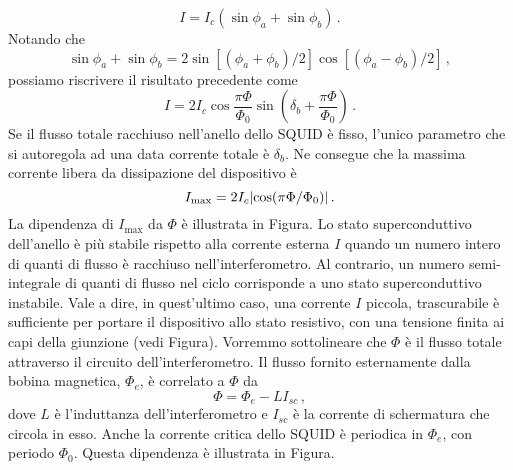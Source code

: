 \begin{equation*}
    I=I_c\left(\sin\phi_a + \sin\phi_b\right) \, .
\end{equation*}
Notando che
\begin{equation*}
    \sin\phi_a + \sin\phi_b = 2\sin[(\phi_a+\phi_b)/2]\cos[(\phi_a-\phi_b)/2] \, ,
\end{equation*}
possiamo riscrivere il risultato precedente come
\begin{equation*}
    I=2I_c \cos \frac{\pi\Phi}{\Phi_0}\sin\left(\delta_b + \frac{\pi\Phi}{\Phi_0}\right) \, .
\end{equation*}
Se il flusso totale racchiuso nell'anello dello SQUID è fisso, l'unico parametro che si autoregola ad una data corrente totale è $\delta_b$. Ne consegue che la massima corrente libera da dissipazione del dispositivo è
\begin{equation*}
    I_{\text{max}}=2I_c\abs{\cos(\pi\Phi/\Phi_0)} \, .
\end{equation*}
La dipendenza di $I_{\text{max}}$ da $\Phi$ è illustrata in Figura.
Lo stato superconduttivo dell'anello è più stabile rispetto alla corrente esterna $I$ quando un numero intero di quanti di flusso è racchiuso nell'interferometro. Al contrario, un numero semi-integrale di quanti di flusso nel ciclo corrisponde a uno stato superconduttivo instabile. Vale a dire, in quest'ultimo caso, una corrente $I$ piccola, trascurabile è sufficiente per portare il dispositivo allo stato resistivo, con una tensione finita ai capi della giunzione (vedi Figura). Vorremmo sottolineare che $\Phi$ è il flusso totale attraverso il circuito dell'interferometro. Il flusso fornito esternamente dalla bobina magnetica, $\Phi_e$, è correlato a $\Phi$ da
\begin{equation*}
    \Phi = \Phi_e - LI_{sc} \, ,
\end{equation*}
dove $L$ è l'induttanza dell'interferometro e $I_{sc}$ è la corrente di schermatura che circola in esso. Anche la corrente critica dello SQUID è periodica in $\Phi_e$, con periodo $\Phi_0$. Questa dipendenza è illustrata in Figura.